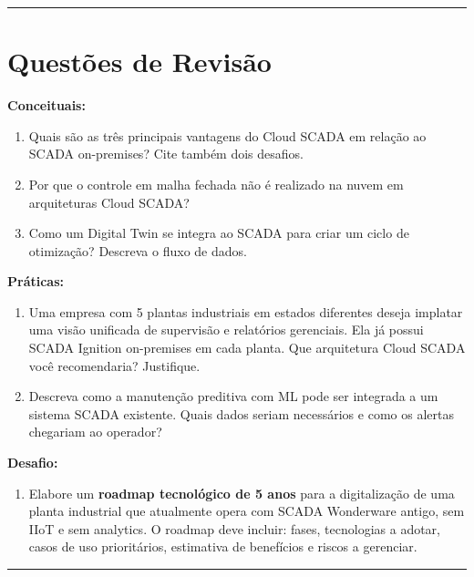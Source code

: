\begin{center}\rule{0.5\linewidth}{0.5pt}\end{center}

\section{Questões de Revisão}\label{questuxf5es-de-revisuxe3o}

\textbf{Conceituais:}

\begin{enumerate}
\def\labelenumi{\arabic{enumi}.}
\tightlist
\item
  Quais são as três principais vantagens do Cloud SCADA em relação ao SCADA on-premises? Cite também dois desafios.
\item
  Por que o controle em malha fechada não é realizado na nuvem em arquiteturas Cloud SCADA?
\item
  Como um Digital Twin se integra ao SCADA para criar um ciclo de otimização? Descreva o fluxo de dados.
\end{enumerate}

\textbf{Práticas:}

\begin{enumerate}
\def\labelenumi{\arabic{enumi}.}
\setcounter{enumi}{3}
\tightlist
\item
  Uma empresa com 5 plantas industriais em estados diferentes deseja implatar uma visão unificada de supervisão e relatórios gerenciais. Ela já possui SCADA Ignition on-premises em cada planta. Que arquitetura Cloud SCADA você recomendaria? Justifique.
\item
  Descreva como a manutenção preditiva com ML pode ser integrada a um sistema SCADA existente. Quais dados seriam necessários e como os alertas chegariam ao operador?
\end{enumerate}

\textbf{Desafio:}

\begin{enumerate}
\def\labelenumi{\arabic{enumi}.}
\setcounter{enumi}{5}
\tightlist
\item
  Elabore um \textbf{roadmap tecnológico de 5 anos} para a digitalização de uma planta industrial que atualmente opera com SCADA Wonderware antigo, sem IIoT e sem analytics. O roadmap deve incluir: fases, tecnologias a adotar, casos de uso prioritários, estimativa de benefícios e riscos a gerenciar.
\end{enumerate}

\begin{center}\rule{0.5\linewidth}{0.5pt}\end{center}

